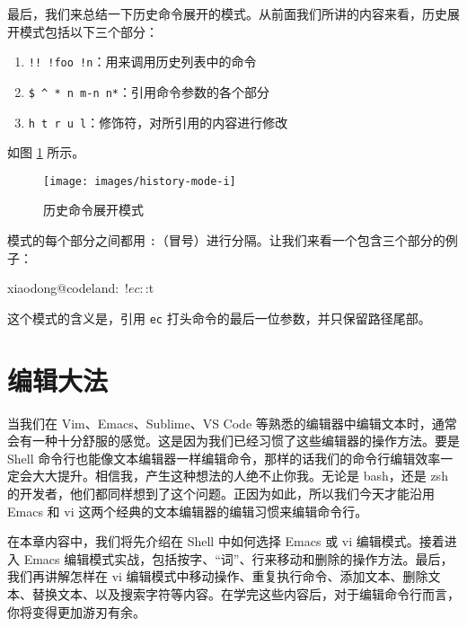 \documentclass[]{ctexbook}
\newenvironment{Shaded}{\begin{snugshade}}{\end{snugshade}}
\newcommand{\ExtensionTok}[1]{#1}
\newcommand{\NormalTok}[1]{#1}
\providecommand{\tightlist}{%
  \setlength{\itemsep}{0pt}\setlength{\parskip}{0pt}}
\begin{document}
最后，我们来总结一下历史命令展开的模式。从前面我们所讲的内容来看，历史展开模式包括以下三个部分：

\begin{enumerate}
\def\labelenumi{\arabic{enumi}.}
\tightlist
\item
  \texttt{!!\ !foo\ !n}：用来调用历史列表中的命令
\item
  \texttt{\$\ \^{}\ *\ n\ m-n\ n*}：引用命令参数的各个部分
\item
  \texttt{h\ t\ r\ u\ l}：修饰符，对所引用的内容进行修改
\end{enumerate}

如图 \ref{fig:history-mode-i} 所示。

\begin{figure}
\texttt{[image: images/history-mode-i]} \caption{历史命令展开模式}\label{fig:history-mode-i}
\end{figure}

模式的每个部分之间都用 \texttt{:}（冒号）进行分隔。让我们来看一个包含三个部分的例子：

\begin{Shaded}
\begin{Highlighting}[]
\ExtensionTok{xiaodong@codeland}\NormalTok{:~$ !ec:$:t}
\end{Highlighting}
\end{Shaded}

这个模式的含义是，引用 \texttt{ec} 打头命令的最后一位参数，并只保留路径尾部。

\hypertarget{ux7f16ux8f91ux5927ux6cd5}{%
\chapter{编辑大法}\label{ux7f16ux8f91ux5927ux6cd5}}

当我们在 Vim、Emacs、Sublime、VS Code 等熟悉的编辑器中编辑文本时，通常会有一种十分舒服的感觉。这是因为我们已经习惯了这些编辑器的操作方法。要是 Shell 命令行也能像文本编辑器一样编辑命令，那样的话我们的命令行编辑效率一定会大大提升。相信我，产生这种想法的人绝不止你我。无论是 bash，还是 zsh 的开发者，他们都同样想到了这个问题。正因为如此，所以我们今天才能沿用 Emacs 和 vi 这两个经典的文本编辑器的编辑习惯来编辑命令行。

在本章内容中，我们将先介绍在 Shell 中如何选择 Emacs 或 vi 编辑模式。接着进入 Emacs 编辑模式实战，包括按字、``词''、行来移动和删除的操作方法。最后，我们再讲解怎样在 vi 编辑模式中移动操作、重复执行命令、添加文本、删除文本、替换文本、以及搜索字符等内容。在学完这些内容后，对于编辑命令行而言，你将变得更加游刃有余。
\end{document}
